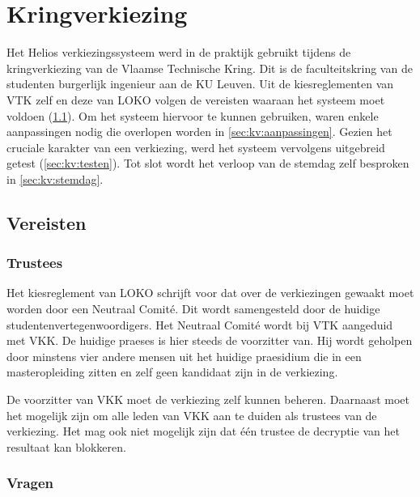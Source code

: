 % 
%

\chapter{Kringverkiezing}
\label{chap:kringverkiezing}

Het Helios verkiezingssysteem werd in de praktijk gebruikt tijdens de kringverkiezing van de Vlaamse Technische Kring. Dit is de faculteitskring van de studenten burgerlijk ingenieur aan de KU Leuven. Uit de kiesreglementen van VTK zelf en deze van LOKO volgen de vereisten waaraan het systeem moet voldoen (\ref{sec:kv:vereisten}). Om het systeem hiervoor te kunnen gebruiken, waren enkele aanpassingen nodig die overlopen worden in \ref{sec:kv:aanpassingen}. Gezien het cruciale karakter van een verkiezing, werd het systeem vervolgens uitgebreid getest (\ref{sec:kv:testen}). Tot slot wordt het verloop van de stemdag zelf besproken in \ref{sec:kv:stemdag}.

\section{Vereisten~\cite{loko_kiesreglement_verkiezingen}\cite{vtk_verkiezingsreglement}}
\label{sec:kv:vereisten}

\subsection{Trustees}

Het kiesreglement van LOKO schrijft voor dat over de verkiezingen gewaakt moet worden door een Neutraal Comit\'e. Dit wordt samengesteld door de huidige studentenvertegenwoordigers. Het Neutraal Comit\'e wordt bij VTK aangeduid met VKK. De huidige praeses is hier steeds de voorzitter van. Hij wordt geholpen door minstens vier andere mensen uit het huidige praesidium die in een masteropleiding zitten en zelf geen kandidaat zijn in de verkiezing.

\npar De voorzitter van VKK moet de verkiezing zelf kunnen beheren. Daarnaast moet het mogelijk zijn om alle leden van VKK aan te duiden als trustees van de verkiezing. Het mag ook niet mogelijk zijn dat \'e\'en trustee de decryptie van het resultaat kan blokkeren.

\subsection{Vragen}


